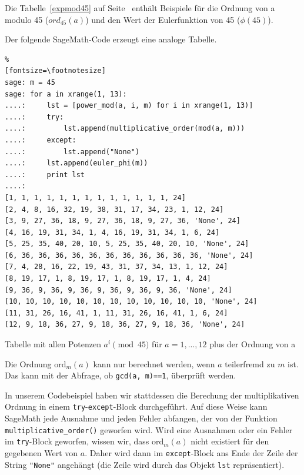 \begin{refsegment}
\newpage
\hypertarget{nt:AppArith3b}{}
\label{nt:AppArith3b}{}
Die Tabelle~\ref{expmod45} auf Seite~\pageref{SrcArith3b} enthält Beispiele
für die Ordnung von a modulo 45 ($ord_{45}(a)$) und den Wert der Eulerfunktion
von 45 ($\phi(45)$).

Der folgende SageMath-Code erzeugt eine analoge Tabelle.

\begin{sagecode}
\begin{Verbatim}%
[fontsize=\footnotesize]
sage: m = 45
sage: for a in xrange(1, 13):
....:     lst = [power_mod(a, i, m) for i in xrange(1, 13)]
....:     try:
....:         lst.append(multiplicative_order(mod(a, m)))
....:     except:
....:         lst.append("None")
....:     lst.append(euler_phi(m))
....:     print lst
....:
[1, 1, 1, 1, 1, 1, 1, 1, 1, 1, 1, 1, 1, 24]
[2, 4, 8, 16, 32, 19, 38, 31, 17, 34, 23, 1, 12, 24]
[3, 9, 27, 36, 18, 9, 27, 36, 18, 9, 27, 36, 'None', 24]
[4, 16, 19, 31, 34, 1, 4, 16, 19, 31, 34, 1, 6, 24]
[5, 25, 35, 40, 20, 10, 5, 25, 35, 40, 20, 10, 'None', 24]
[6, 36, 36, 36, 36, 36, 36, 36, 36, 36, 36, 36, 'None', 24]
[7, 4, 28, 16, 22, 19, 43, 31, 37, 34, 13, 1, 12, 24]
[8, 19, 17, 1, 8, 19, 17, 1, 8, 19, 17, 1, 4, 24]
[9, 36, 9, 36, 9, 36, 9, 36, 9, 36, 9, 36, 'None', 24]
[10, 10, 10, 10, 10, 10, 10, 10, 10, 10, 10, 10, 'None', 24]
[11, 31, 26, 16, 41, 1, 11, 31, 26, 16, 41, 1, 6, 24]
[12, 9, 18, 36, 27, 9, 18, 36, 27, 9, 18, 36, 'None', 24]
\end{Verbatim}
\caption{Tabelle mit allen Potenzen $a^i \pmod{45}$ für $a=1,...,12$ plus der Ordnung von a}
\label{nt_Sage-code_MultOrder_expmod45}
\end{sagecode}

Die Ordnung $\text{ord}_m(a)$ kann nur berechnet werden, wenn $a$
teilerfremd zu $m$ ist.
Das kann mit der Abfrage, ob \verb!gcd(a, m)==1!, überprüft werden.

In unserem Codebeispiel haben wir stattdessen die Berechung der
multiplikativen Ordnung in einem \verb!try!-\verb!except!-Block
durchgeführt. Auf diese Weise kann SageMath jede Ausnahme und jeden Fehler
abfangen, der von der Funktion \verb!multiplicative_order()! geworfen wird.
Wird eine Ausnahmen oder ein Fehler im \verb!try!-Block geworfen, wissen
wir, dass $\text{ord}_m(a)$ nicht existiert für den gegebenen Wert von $a$.
Daher wird dann im \verb!except!-Block ans Ende der Zeile der String \verb!"None"!
angehängt (die Zeile wird durch das Objekt \verb!lst! repräsentiert).



\end{refsegment}
